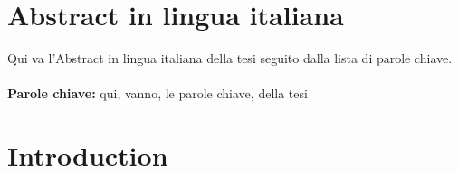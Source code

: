 \documentclass{report}
\begin{document}
\chapter*{Abstract in lingua italiana}
Qui va l'Abstract in lingua italiana della tesi seguito dalla lista di parole chiave.
\\
\\
\textbf{Parole chiave:} qui, vanno, le parole chiave, della tesi %


\thispagestyle{empty}
\tableofcontents %
\thispagestyle{empty}
\cleardoublepage

%
%
%    
%

\mainmatter %

\chapter*{Introduction}
\end{document}
